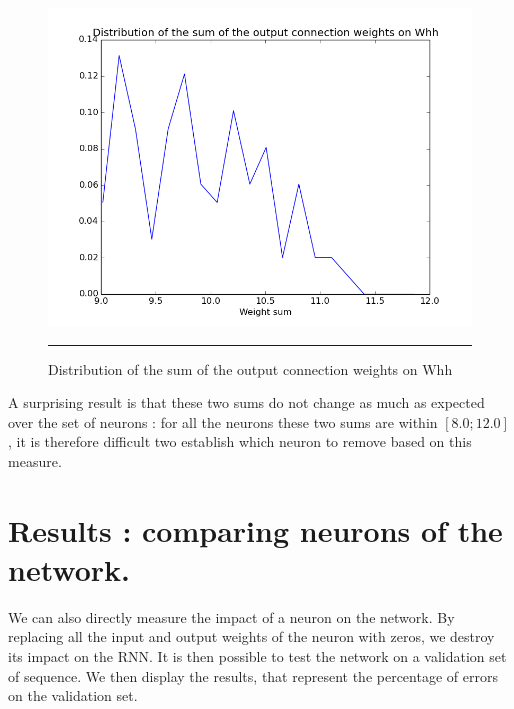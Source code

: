 \begin{figure}[htbp]
    \centering
    \includegraphics[scale=0.4]{Figures/output_sum_weight_distribution.png}
    \rule{35em}{0.5pt}
    \caption[Distribution of the sum of the output connection weights on Whh]{Distribution of the sum of the output connection weights on Whh}
    \label{fig:output_sum}
\end{figure}

A surprising result is that these two sums do not change as much as expected over the set of neurons : for all the neurons these two sums are within $[8.0; 12.0]$, it is therefore difficult two establish which neuron to remove based on this measure.

\newpage

\section{Results : comparing neurons of the network.}

We can also directly measure the impact of a neuron on the network. By replacing all the input and output weights of the neuron with zeros, we destroy its impact on the RNN. It is then possible to test the network on a validation set of sequence. We then display the results, that represent the percentage of errors on the validation set. 

